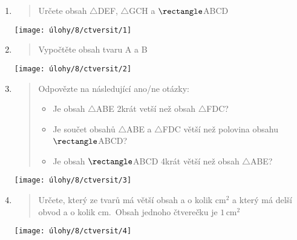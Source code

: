 \begin{enumerate}
    \item
    \begin{minipage}[t]{\linewidth}
        \begin{quote}
            Určete obsah $\triangle$DEF, $\triangle$GCH a $\rectangle$ABCD
        \end{quote}
        \centering
        \texttt{[image: úlohy/8/ctversit/1]}

    \end{minipage}

    \item
    \begin{minipage}[t]{\linewidth}
        \begin{quote}
            Vypočtěte obsah tvaru A a B
        \end{quote}
        \centering
        \texttt{[image: úlohy/8/ctversit/2]}

    \end{minipage}

    \item
    \begin{minipage}[t]{\linewidth}
        \begin{quote}
            Odpovězte na následující ano/ne otázky:
            \begin{itemize}
                \item Je obsah $\triangle$ABE 2krát vetší než obsah $\triangle$FDC?
                \item Je součet obsahů $\triangle$ABE a $\triangle$FDC větší než polovina obsahu $\rectangle$ABCD?
                \item Je obsah $\rectangle$ABCD 4krát větší než obsah $\triangle$ABE?
            \end{itemize}
        \end{quote}
        \centering
        \texttt{[image: úlohy/8/ctversit/3]}

    \end{minipage}

    \item
    \begin{minipage}[t]{\linewidth}
        \begin{quote}
            Určete, který ze tvarů má větší obsah a o kolik cm$^{2}$ a který má delší obvod a o kolik cm.\             Obsah jednoho čtverečku je $1\,\text{cm}^2$
        \end{quote}
        \centering
        \texttt{[image: úlohy/8/ctversit/4]}


\end{minipage}
\end{enumerate}
